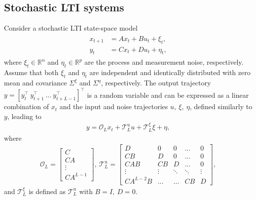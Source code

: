 \documentclass[letterpaper, 10 pt, conference]{ieeeconf}
\begin{document}
\subsection{Stochastic \gls{LTI} systems}
Consider a stochastic \gls{LTI} state-space model
\begin{align} \label{eq:stochastic-SS}
\begin{split}
     x_{t+1} &= Ax_t + Bu_t + \xi_t,\\
    y_t & = Cx_t + D u_t + \eta_t,
\end{split}
\end{align}
where $\xi_t\in\mathbb{R}^n$ and $\eta_t\in\mathbb{R}^p$ are the process and measurement noise, respectively.
Assume that both $\xi_t$ and $\eta_t$ are independent and identically distributed with zero mean and covariance $\Sigma^\xi$ and $\Sigma^\eta$, respectively.
The output trajectory $y=[y_t^\top~y_{t+1}^\top~\dots~y_{t+L-1}^\top]^\top$ is a random variable and can be expressed as a linear combination of $x_t$ and the input and noise trajectories $u,~\xi,~\eta$, defined similarly to $y$, leading to 
\begin{align} \label{eq:stochastic_ss_linear}
    y = \mathcal{O}_L x_t + \mathcal{T}_L^\mathrm{u} u + \mathcal{T}_L^\xi \xi + \eta,
\end{align}
where 
\small
\begin{align*}
    \mathcal{O}_L = \begin{bmatrix}
        C \\ CA \\ \vdots \\ CA^{L-1}
    \end{bmatrix},~ \mathcal{T}_L^\mathrm{u} = 
    \begin{bmatrix}
      D & 0 & 0 & \dots & 0 \\
        CB & D & 0 & \dots & 0 \\
        CAB & CB & D &\dots  & 0\\
        \vdots & \vdots & \ddots & \ddots & \vdots \\
        CA^{L-2}B & \dots & \dots & CB & D   
  \end{bmatrix},
\end{align*}
\normalsize
and $\mathcal{T}_L^\xi$ is defined as $\mathcal{T}_L^\mathrm{u}$ with $B=I,~D = 0$.
\end{document}
